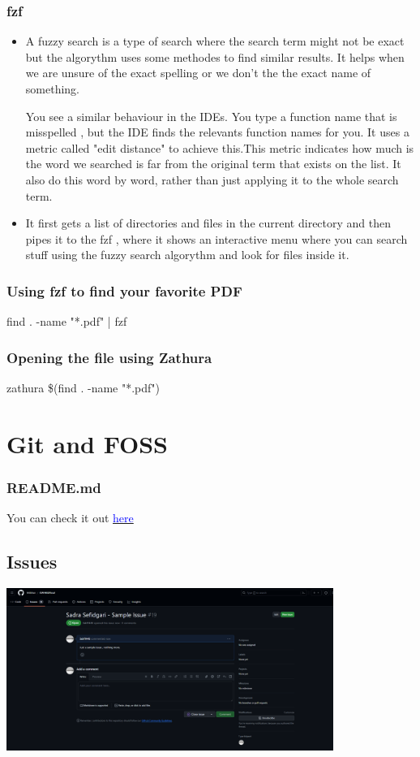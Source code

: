 \documentclass[titlepage]{article}
\begin{document}
\subsubsection{fzf}
\begin{itemize}
\item A fuzzy search is a type of search where the search term might not be exact but the algorythm uses some methodes to find similar results.
  It helps when we are unsure of the exact spelling or we don't the the exact name of something.

    You see a similar behaviour in the IDEs. You type a function name that is misspelled , but the IDE finds the relevants function names for you.
  It uses a metric called "edit distance" to achieve this.This metric indicates how much is the word we searched is far from the original term that exists on the list.
    It also do this word by word, rather than just applying it to the whole search term.
\item It first gets a list of directories and files in the current directory and then pipes it to the fzf , where it shows an interactive menu where you can search stuff using the fuzzy search algorythm and look for files inside it.
\end{itemize}
\subsubsection{Using fzf to find your favorite PDF}
    find . -name "*.pdf" | fzf
\subsubsection{Opening the file using Zathura}
    zathura \$(find . -name "*.pdf")
\section{Git and FOSS}
\subsubsection{README.md}
    You can check it out \href{https://github.com/Sdrf1445/CW1402FINAL}{\textcolor{blue}{here}}  
\subsection{Issues}
\includegraphics[width=0.8\textwidth]{screen.png}



   






  
\end{document}
